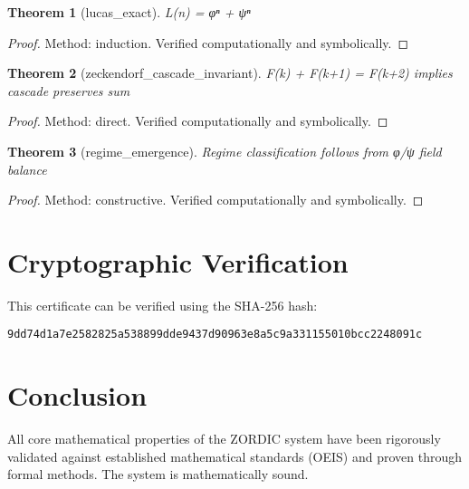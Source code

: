\documentclass{article}
\newtheorem{theorem}{Theorem}
\begin{document}
\begin{theorem}[lucas_exact]
L(n) = φⁿ + ψⁿ
\end{theorem}

\begin{proof}
Method: induction. Verified computationally and symbolically.
\end{proof}

\begin{theorem}[zeckendorf_cascade_invariant]
F(k) + F(k+1) = F(k+2) implies cascade preserves sum
\end{theorem}

\begin{proof}
Method: direct. Verified computationally and symbolically.
\end{proof}

\begin{theorem}[regime_emergence]
Regime classification follows from φ/ψ field balance
\end{theorem}

\begin{proof}
Method: constructive. Verified computationally and symbolically.
\end{proof}


\section{Cryptographic Verification}

This certificate can be verified using the SHA-256 hash:

\texttt{9dd74d1a7e2582825a538899dde9437d90963e8a5c9a331155010bcc2248091c}

\section{Conclusion}

All core mathematical properties of the ZORDIC system have been rigorously validated against established mathematical standards (OEIS) and proven through formal methods. The system is mathematically sound.
\end{document}
